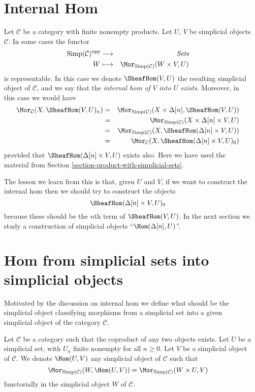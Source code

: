 \section{Internal Hom}
\label{section-internal-hom}

\noindent
Let $\mathcal{C}$ be a category with finite nonempty
products. Let $U$, $V$ be simplicial objects $\mathcal{C}$.
In some cases the functor
\begin{eqnarray*}
\text{Simp}(\mathcal{C})^{opp} & \longrightarrow & \textit{Sets} \\
W & \longmapsto & \Mor_{\text{Simp}(\mathcal{C})}(W \times V, U)
\end{eqnarray*}
is representable. In this case we denote $\SheafHom(V, U)$
the resulting simplicial object of $\mathcal{C}$, and we say
that the {\it internal hom of $V$ into $U$ exists}. Moreover,
in this case we would have
\begin{eqnarray*}
\Mor_\mathcal{C}(X, \SheafHom(V, U)_n)
& = &
\Mor_{\text{Simp}(\mathcal{C})}(X \times \Delta[n], \SheafHom(V, U))
\\
& = &
\Mor_{\text{Simp}(\mathcal{C})}(X \times \Delta[n]\times V, U) \\
& = &
\Mor_{\text{Simp}(\mathcal{C})}(X, \SheafHom(\Delta[n] \times V, U))
\\
& = &
\Mor_\mathcal{C}(X, \SheafHom(\Delta[n] \times V, U)_0)
\end{eqnarray*}
provided that $\SheafHom(\Delta[n] \times V, U)$
exists also. Here we have used the material from Section
\ref{section-product-with-simplicial-sets}.

\medskip\noindent
The lesson we learn from this is that, given $U$ and $V$,
if we want to construct the internal hom then we should try to
construct the objects
$$
\SheafHom(\Delta[n] \times V, U)_0
$$
because these should be the $n$th term of $\SheafHom(V, U)$.
In the next section we study a construction of simplicial objects
``$\Hom(\Delta[n], U)$''.


\section{Hom from simplicial sets into simplicial objects}
\label{section-hom-from-simplicial-sets}

\noindent
Motivated by the discussion on internal hom we define
what should be the simplicial object classifying
morphisms from a simplicial set into a given
simplicial object of the category $\mathcal{C}$.

\begin{definition}
\label{definition-hom-from-simplicial-set}
Let $\mathcal{C}$ be a category such that the coproduct
of any two objects exists.
Let $U$ be a simplicial set, with $U_n$ finite nonempty
for all $n \geq 0$.
Let $V$ be a simplicial object of $\mathcal{C}$.
We denote {\it $\Hom(U, V)$} any simplicial object of
$\mathcal{C}$ such that
$$
\Mor_{\text{Simp}(\mathcal{C})}(W, \Hom(U, V))
=
\Mor_{\text{Simp}(\mathcal{C})}(W \times U, V)
$$
functorially in the simplicial object $W$ of $\mathcal{C}$.
\end{definition}

